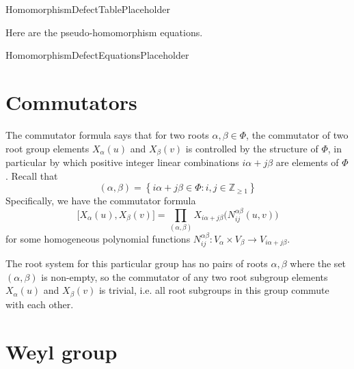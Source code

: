 \documentclass[11pt]{article}
\newcommand{\noi}{\noindent}
\newcommand{\tbf}{\textbf}
\newcommand{\lb}{\left\{}
\newcommand{\rb}{\right\}}
\newcommand{\Z}{\mathbb{Z}}
\theoremstyle{definition}
\newif\ifsummablepairs
\begin{document}
\bigskip

HomomorphismDefectTablePlaceholder

\bigskip

\noi Here are the pseudo-homomorphism equations.

HomomorphismDefectEquationsPlaceholder

\fi

\newpage
\section{Commutators}

The commutator formula says that for two roots $\alpha, \beta \in \Phi$, the commutator of two root group elements $X_\alpha(u)$ and $X_\beta(v)$ is controlled by the structure of $\Phi$, in particular by which positive integer linear combinations $i\alpha + j\beta$ are elements of $\Phi$. Recall that
\[
	(\alpha, \beta) = \lb i \alpha + j\beta \in \Phi : i, j \in \Z_{\ge 1} \rb
\]
Specifically, we have the commutator formula
\[
	\Big[ X_\alpha(u), X_\beta(v) \Big] = \prod_{(\alpha, \beta)} X_{i\alpha + j\beta} \Big( N_{ij}^{\alpha \beta}(u,v) \Big)
\]
for some homogeneous polynomial functions $N_{ij}^{\alpha \beta}:V_{\alpha} \times V_{\beta} \to V_{i\alpha+j\beta}$. 
\ifsummablepairs
We repeat here the table of linear combinations of roots. The quantity $N_{ij}^{\alpha \beta}(u,v)$ is called a \tbf{commutator coefficient}. The table below gives these coefficients.

\bigskip

\def\arraystretch{1.2}
\noi 
\def\arraystretch{1}

\subsection{Commutator identities}

CommutatorEquationsPlaceholder

\else
The root system for this particular group has no pairs of roots $\alpha, \beta$ where the set $(\alpha, \beta)$ is non-empty, so the commutator of any two root subgroup elements $X_\alpha(u)$ and $X_\beta(v)$ is trivial, i.e. all root subgroups in this group commute with each other.
\fi

\newpage
\section{Weyl group}
\end{document}
